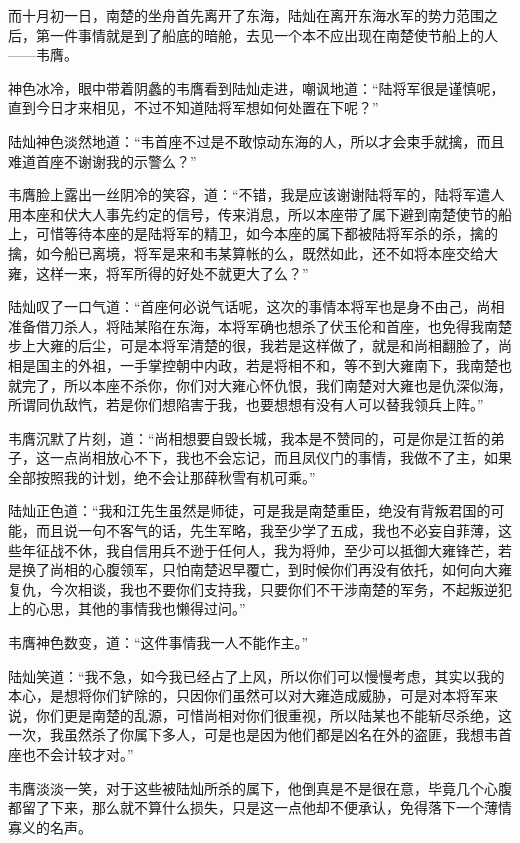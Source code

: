 而十月初一日，南楚的坐舟首先离开了东海，陆灿在离开东海水军的势力范围之后，第一件事情就是到了船底的暗舱，去见一个本不应出现在南楚使节船上的人——韦膺。

神色冰冷，眼中带着阴蠡的韦膺看到陆灿走进，嘲讽地道：“陆将军很是谨慎呢，直到今日才来相见，不过不知道陆将军想如何处置在下呢？”

陆灿神色淡然地道：“韦首座不过是不敢惊动东海的人，所以才会束手就擒，而且难道首座不谢谢我的示警么？”

韦膺脸上露出一丝阴冷的笑容，道：“不错，我是应该谢谢陆将军的，陆将军遣人用本座和伏大人事先约定的信号，传来消息，所以本座带了属下避到南楚使节的船上，可惜等待本座的是陆将军的精卫，如今本座的属下都被陆将军杀的杀，擒的擒，如今船已离境，将军是来和韦某算帐的么，既然如此，还不如将本座交给大雍，这样一来，将军所得的好处不就更大了么？”

陆灿叹了一口气道：“首座何必说气话呢，这次的事情本将军也是身不由己，尚相准备借刀杀人，将陆某陷在东海，本将军确也想杀了伏玉伦和首座，也免得我南楚步上大雍的后尘，可是本将军清楚的很，我若是这样做了，就是和尚相翻脸了，尚相是国主的外祖，一手掌控朝中内政，若是将相不和，等不到大雍南下，我南楚也就完了，所以本座不杀你，你们对大雍心怀仇恨，我们南楚对大雍也是仇深似海，所谓同仇敌忾，若是你们想陷害于我，也要想想有没有人可以替我领兵上阵。”

韦膺沉默了片刻，道：“尚相想要自毁长城，我本是不赞同的，可是你是江哲的弟子，这一点尚相放心不下，我也不会忘记，而且凤仪门的事情，我做不了主，如果全部按照我的计划，绝不会让那薛秋雪有机可乘。”

陆灿正色道：“我和江先生虽然是师徒，可是我是南楚重臣，绝没有背叛君国的可能，而且说一句不客气的话，先生军略，我至少学了五成，我也不必妄自菲薄，这些年征战不休，我自信用兵不逊于任何人，我为将帅，至少可以抵御大雍锋芒，若是换了尚相的心腹领军，只怕南楚迟早覆亡，到时候你们再没有依托，如何向大雍复仇，今次相谈，我也不要你们支持我，只要你们不干涉南楚的军务，不起叛逆犯上的心思，其他的事情我也懒得过问。”

韦膺神色数变，道：“这件事情我一人不能作主。”

陆灿笑道：“我不急，如今我已经占了上风，所以你们可以慢慢考虑，其实以我的本心，是想将你们铲除的，只因你们虽然可以对大雍造成威胁，可是对本将军来说，你们更是南楚的乱源，可惜尚相对你们很重视，所以陆某也不能斩尽杀绝，这一次，我虽然杀了你属下多人，可是也是因为他们都是凶名在外的盗匪，我想韦首座也不会计较才对。”

韦膺淡淡一笑，对于这些被陆灿所杀的属下，他倒真是不是很在意，毕竟几个心腹都留了下来，那么就不算什么损失，只是这一点他却不便承认，免得落下一个薄情寡义的名声。

